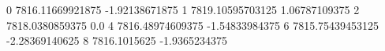 0 7816.11669921875 -1.92138671875
1 7819.10595703125 1.06787109375
2 7818.0380859375 0.0
4 7816.48974609375 -1.54833984375
6 7815.75439453125 -2.28369140625
8 7816.1015625 -1.9365234375
